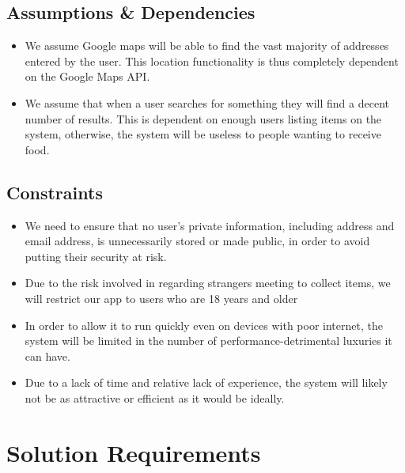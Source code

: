 \documentclass[12pt]{article}
\begin{document}
\subsection{Assumptions \& Dependencies}
\begin{itemize}

    \item We assume Google maps will be able to find the vast majority of
        addresses entered by the user.
        This location functionality is thus completely dependent on the Google Maps API.

    \item We assume that when a user searches for something they will find a
        decent number of results.
        This is dependent on enough users listing items on the system,
        otherwise, the system will be useless to people wanting to receive food.

\end{itemize}

\subsection{Constraints}
\begin{itemize}

\item We need to ensure that no user’s private information, including address
    and email address, is unnecessarily stored or made public, in order to
    avoid putting their security at risk.

\item Due to the risk involved in regarding strangers meeting to collect items,
    we will restrict our app to users who are 18 years and older

\item In order to allow it to run quickly even on devices with poor internet,
    the system will be limited in the
    number of performance-detrimental luxuries it can have.

\item Due to a lack of time and relative lack of experience,
    the system will likely not be as attractive or efficient as it would be ideally.

\end{itemize}

\section{Solution Requirements}
\end{document}
